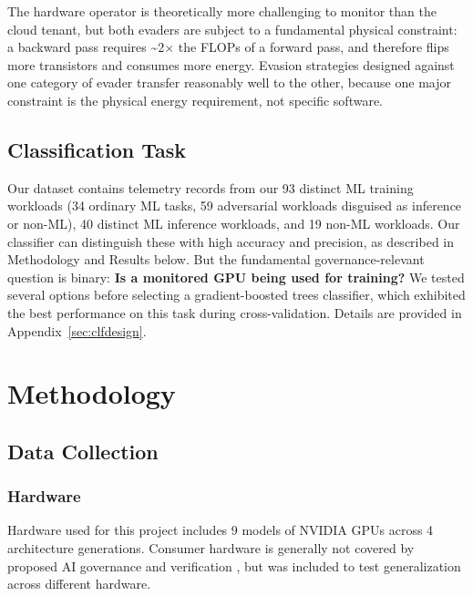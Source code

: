 The hardware operator is theoretically more challenging to monitor than the cloud tenant, but both evaders are subject to a fundamental physical constraint: a backward pass requires \textasciitilde{}2$\times$ the FLOPs of a forward pass, and therefore flips more transistors and consumes more energy. Evasion strategies designed against one category of evader transfer reasonably well to the other, because one major constraint is the physical energy requirement, not specific software.

\subsection{Classification Task}

Our dataset contains telemetry records from our 93 distinct ML training workloads (34 ordinary ML tasks, 59 adversarial workloads disguised as inference or non-ML), 40 distinct ML inference workloads, and 19 non-ML workloads. Our classifier can distinguish these with high accuracy and precision, as described in Methodology and Results below. But the fundamental governance-relevant question is binary: \textbf{Is a monitored GPU being used for training?} We tested several options before selecting a gradient-boosted trees classifier, which exhibited the best performance on this task during cross-validation. Details are provided in Appendix~\ref{sec:clfdesign}.

\section{Methodology}
\label{sec:method}

\subsection{Data Collection}

\subsubsection{Hardware}

Hardware used for this project includes 9 models of NVIDIA GPUs across 4 architecture generations. Consumer hardware is generally not covered by proposed AI governance and verification \citep{heim2024,scher2025}, but was included to test generalization across different hardware.

